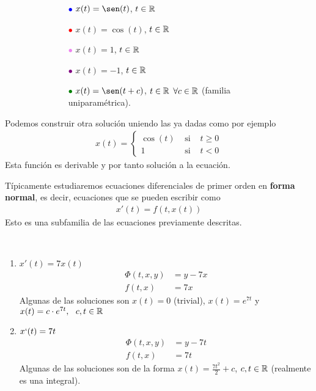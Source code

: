\begin{ejemplo}
\begin{figure}[H]
\begin{subfigure}{0.3\textwidth}
        \end{subfigure}
        \hfill
        \begin{subfigure}{0.6\textwidth}%
            \begin{itemize}
                \item[\textcolor{blue}{$\bullet$}] $x(t) = \sen(t)$, $t \in \mathbb{R}$
                \item[\textcolor{red}{$\bullet$}] $x(t)= \cos(t)$, $t \in \mathbb{R}$
                \item[\textcolor{violet}{$\bullet$}] $x(t)=1$, $t \in \mathbb{R}$
                \item[\textcolor{purple}{$\bullet$}] $x(t)=-1$, $t \in \mathbb{R}$
                \item[\textcolor{green}{$\bullet$}] $x(t)=\sen(t+c)$, $t \in \mathbb{R}$ $\forall c \in \mathbb{R}$ (familia uniparamétrica).
            \end{itemize}
        \end{subfigure}
        \hfill
    \end{figure}

    Podemos construir otra solución uniendo las ya dadas como por ejemplo
    \begin{gather*}
        x(t)=\left\{
        \begin{array}{ccc}
            \cos(t)& \text{ si }& t \geq 0\\
            1&  \text{ si } & t <0
        \end{array}
        \right.
    \end{gather*}
    Esta función es derivable y por tanto solución a la ecuación.

\end{ejemplo}

Típicamente estudiaremos ecuaciones diferenciales de primer orden en \textbf{forma normal}, es decir, ecuaciones que se pueden escribir como
\begin{gather*}
    x'(t) = f(t, x(t))
\end{gather*}
Esto es una subfamilia de las ecuaciones previamente descritas.

\begin{ejemplo}\ 
    \begin{enumerate}[label=\alph*)]
        \item $x'(t)=7x(t)$
        \begin{align*}
            \Phi(t,x,y)&=y-7x \\
            f(t,x) &= 7x
        \end{align*}
        Algunas de las soluciones son $x(t)=0$ (trivial), $x(t)=e^{7t}$ y $x(t)=c \cdot e^{7t},\ \ c, t\in \mathbb{R}$

        \item $x`(t)=7t$
        \begin{align*}
            \Phi(t,x,y)&=y-7t \\
            f(t,x) &= 7t
        \end{align*}
        Algunas de las soluciones son de la forma $x(t)=\frac{7t^2}{2} + c$, $c, t \in \mathbb{R}$ (realmente es una integral).
    \end{enumerate}
\end{ejemplo}

